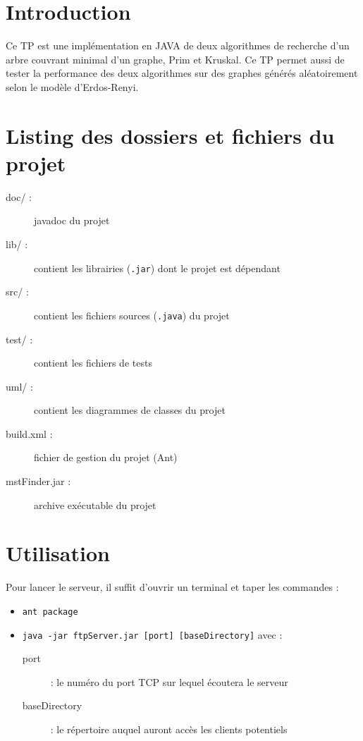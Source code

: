 \section*{Introduction}
Ce TP est une implémentation en JAVA de deux algorithmes de recherche d'un arbre couvrant minimal d'un graphe, Prim et Kruskal. Ce TP permet aussi de tester la performance des deux algorithmes sur des graphes générés aléatoirement selon le modèle d'Erdos-Renyi.

\section*{Listing des dossiers et fichiers du projet}
\begin{description}
	\item[doc/ :] javadoc du projet
	\item[lib/ :] contient les librairies (\verb+.jar+) dont le projet est dépendant
	\item[src/ :] contient les fichiers sources (\verb+.java+) du projet
	\item[test/ :] contient les fichiers de tests
	\item[uml/ :] contient les diagrammes de classes du projet
	\item[build.xml :] fichier de gestion du projet (Ant)
	\item[mstFinder.jar :] archive exécutable du projet
\end{description}

\section*{Utilisation}
Pour lancer le serveur, il suffit d'ouvrir un terminal et taper les commandes :
\begin{itemize}
	\item \verb+ant package+
	\item \verb+java -jar ftpServer.jar [port] [baseDirectory]+ avec :
		\begin{description}
			\item[port] : le numéro du port TCP sur lequel écoutera le serveur
			\item[baseDirectory] : le répertoire auquel auront accès les clients potentiels
		\end{description}
\end{itemize}

